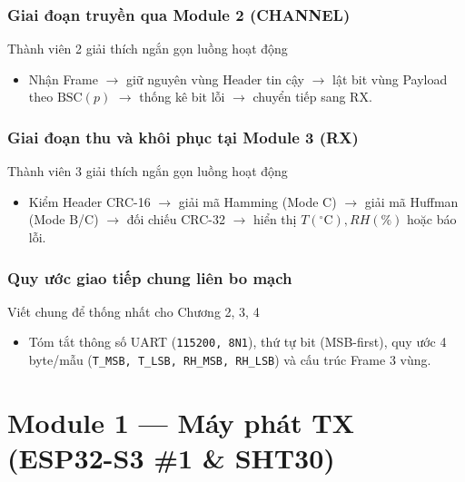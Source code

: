\documentclass[12pt,a4paper]{report}
\begin{document}
\subsection{Giai đoạn truyền qua Module 2 (CHANNEL)}
\begin{notebox}{Thành viên 2 giải thích ngắn gọn luồng hoạt động}
\begin{itemize}[leftmargin=*,nosep]
    \item Nhận Frame $\rightarrow$ giữ nguyên vùng Header tin cậy $\rightarrow$ lật bit vùng Payload theo $\text{BSC}(p)$ $\rightarrow$ thống kê bit lỗi $\rightarrow$ chuyển tiếp sang RX.
\end{itemize}
\end{notebox}

\subsection{Giai đoạn thu và khôi phục tại Module 3 (RX)}
\begin{notebox}{Thành viên 3 giải thích ngắn gọn luồng hoạt động}
\begin{itemize}[leftmargin=*,nosep]
    \item Kiểm Header CRC-16 $\rightarrow$ giải mã Hamming (Mode C) $\rightarrow$ giải mã Huffman (Mode B/C) $\rightarrow$ đối chiếu CRC-32 $\rightarrow$ hiển thị $T(^\circ\text{C}), RH(\%)$ hoặc báo lỗi.
\end{itemize}
\end{notebox}

\subsection{Quy ước giao tiếp chung liên bo mạch}
\begin{notebox}{Viết chung để thống nhất cho Chương 2, 3, 4}
\begin{itemize}[leftmargin=*,nosep]
    \item Tóm tắt thông số UART (\texttt{115200, 8N1}), thứ tự bit (MSB-first), quy ước 4 byte/mẫu (\texttt{T\_MSB, T\_LSB, RH\_MSB, RH\_LSB}) và cấu trúc Frame 3 vùng.
\end{itemize}
\end{notebox}

\chapter{Module 1 --- Máy phát TX (ESP32-S3 \#1 \& SHT30)}
\end{document}
